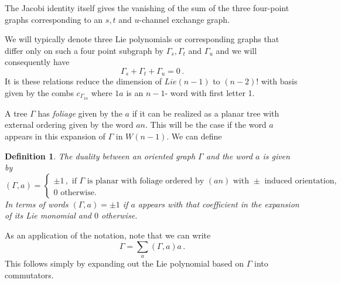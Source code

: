 \documentclass[11pt]{article}
\newcommand{\1}{{\rm 1\hskip-0.25em I}}
\newtheorem{defn}{Definition}[section]
\begin{document}

  The Jacobi identity itself gives the vanishing of the sum of the three four-point graphs corresponding to an $s, t$ and $u$-channel exchange graph.  
  
  \begin{center}
\end{center}
We will typically denote three Lie polynomials or corresponding graphs that differ only on such a four point subgraph by $\Gamma_s, \Gamma_t$ and $\Gamma_u$ and  we will consequently have
\begin{equation}
\Gamma_s+\Gamma_t+\Gamma_u=0\, .
\end{equation}
It is these relations reduce the dimension of $Lie(n-1)$ to $(n-2)!$ with basis given by the combs $c_{\Gamma_{1a}}$ where $1a$ is an $n-1$- word with first letter 1.   


A tree $\Gamma$ has  \emph{foliage}  given by the  $a$ if it can be realized as a planar tree with external ordering given by the word $an$.  This will be the case if the word $a$  appears in this expansion of $\Gamma$ in $W(n-1)$. We can define
\begin{defn}
The duality between an oriented graph $\Gamma$  and the word $a$ is given by
\begin{equation}
(\Gamma,a)=\begin{cases} \pm1\, , \mbox{ if $\Gamma$ is  planar  with foliage ordered by $(an)$ with $\pm$ induced orientation},\\
 0 \mbox{ otherwise.}\end{cases}
\end{equation}
In terms of words  $(\Gamma,a)=\pm 1$ if $a$ appears with that coefficient in the expansion of its Lie monomial and $0$ otherwise.
\end{defn}
As an application of the notation, note that we can write
\begin{equation}
\Gamma=\sum_a  (\Gamma,a)a \, .\label{gamma-a}
\end{equation}
This follows simply  by expanding out the Lie polynomial based on $\Gamma$ into commutators.
\end{document}
